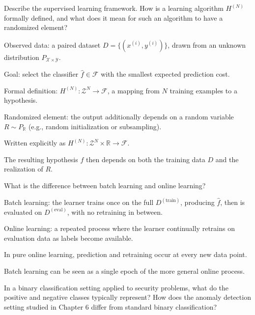 \documentclass[10pt]{extarticle}
\newcommand{\resposta}[1]{\par\smallskip\noindent #1}
\begin{document}
\begin{questoes}
\item Describe the supervised learning framework. How is a learning algorithm $H^{(N)}$ formally defined, and what does it mean for such an algorithm to have a randomized element?

\resposta{
\begin{topicos}
\item Observed data: a paired dataset $D = \{(x^{(i)}, y^{(i)})\}$, drawn from an unknown distribution $P_{\mathcal{X} \times \mathcal{Y}}$.
\item Goal: select the classifier $\hat{f} \in \mathcal{F}$ with the smallest expected prediction cost.
\item Formal definition: $H^{(N)}: \mathcal{Z}^N \to \mathcal{F}$, a mapping from $N$ training examples to a hypothesis.
\item Randomized element: the output additionally depends on a random variable $R \sim P_{\mathbb{R}}$ (e.g., random initialization or subsampling).
\item Written explicitly as $H^{(N)}: \mathcal{Z}^N \times \mathbb{R} \to \mathcal{F}$.
\item The resulting hypothesis $f$ then depends on both the training data $D$ and the realization of $R$.
\end{topicos}
}

\item What is the difference between batch learning and online learning?

\resposta{
\begin{topicos}
\item Batch learning: the learner trains once on the full $D^{(\text{train})}$, producing $\hat{f}$, then is evaluated on $D^{(\text{eval})}$, with no retraining in between.
\item Online learning: a repeated process where the learner continually retrains on evaluation data as labels become available.
\item In pure online learning, prediction and retraining occur at every new data point.
\item Batch learning can be seen as a single epoch of the more general online process.
\end{topicos}
}

\item In a binary classification setting applied to security problems, what do the positive and negative classes typically represent? How does the anomaly detection setting studied in Chapter 6 differ from standard binary classification?


\end{questoes}
\end{document}
